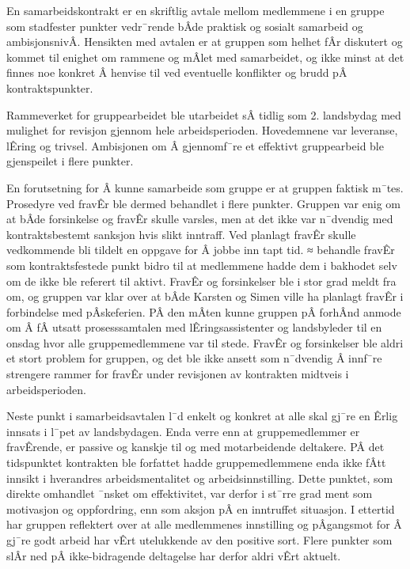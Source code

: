 En samarbeidskontrakt er en skriftlig avtale mellom medlemmene i en gruppe som stadfester punkter vedr¯rende bÂde praktisk og sosialt samarbeid og ambisjonsnivÂ. 
Hensikten med avtalen er at gruppen som helhet fÂr diskutert og kommet til enighet om rammene og mÂlet med samarbeidet, og ikke minst at det finnes noe konkret Â henvise til ved eventuelle konflikter og brudd pÂ kontraktspunkter. 

Rammeverket for gruppearbeidet ble utarbeidet sÂ tidlig som 2. landsbydag med mulighet for revisjon gjennom hele arbeidsperioden. 
Hovedemnene var leveranse, lÊring og trivsel.
Ambisjonen om Â gjennomf¯re et effektivt gruppearbeid ble gjenspeilet i flere punkter. 

En forutsetning for Â kunne samarbeide som gruppe er at gruppen faktisk m¯tes. 
Prosedyre ved fravÊr ble dermed behandlet i flere punkter. 
Gruppen var enig om at bÂde forsinkelse og fravÊr skulle varsles, men at det ikke var n¯dvendig med kontraktsbestemt sanksjon hvis slikt inntraff. 
Ved planlagt fravÊr skulle vedkommende bli tildelt en oppgave for Â jobbe inn tapt tid. 
≈ behandle fravÊr som kontraktsfestede punkt bidro til at medlemmene hadde dem i bakhodet selv om de ikke ble referert til aktivt.
FravÊr og forsinkelser ble i stor grad meldt fra om, og gruppen var klar over at bÂde Karsten og Simen ville ha planlagt fravÊr i forbindelse med pÂskeferien. 
PÂ den mÂten kunne gruppen pÂ forhÂnd anmode om Â fÂ utsatt prosesssamtalen med lÊringsassistenter og landsbyleder til en onsdag hvor alle gruppemedlemmene var til stede.
FravÊr og forsinkelser ble aldri et stort problem for gruppen, og det ble ikke ansett som n¯dvendig Â innf¯re strengere rammer for fravÊr under revisjonen av kontrakten midtveis i arbeidsperioden. 

Neste punkt i samarbeidsavtalen l¯d enkelt og konkret at alle skal gj¯re en Êrlig innsats i l¯pet av landsbydagen.
Enda verre enn at gruppemedlemmer er fravÊrende, er passive og kanskje til og med motarbeidende deltakere.
PÂ det tidspunktet kontrakten ble forfattet hadde gruppemedlemmene enda ikke fÂtt innsikt i hverandres arbeidsmentalitet og arbeidsinnstilling.
Dette punktet, som direkte omhandlet ¯nsket om effektivitet, var derfor i st¯rre grad ment som motivasjon og oppfordring, enn som aksjon pÂ en inntruffet situasjon.
I ettertid har gruppen reflektert over at alle medlemmenes innstilling og pÂgangsmot for Â gj¯re godt arbeid har vÊrt utelukkende av den positive sort.
Flere punkter som slÂr ned pÂ ikke-bidragende deltagelse har derfor aldri vÊrt aktuelt.

